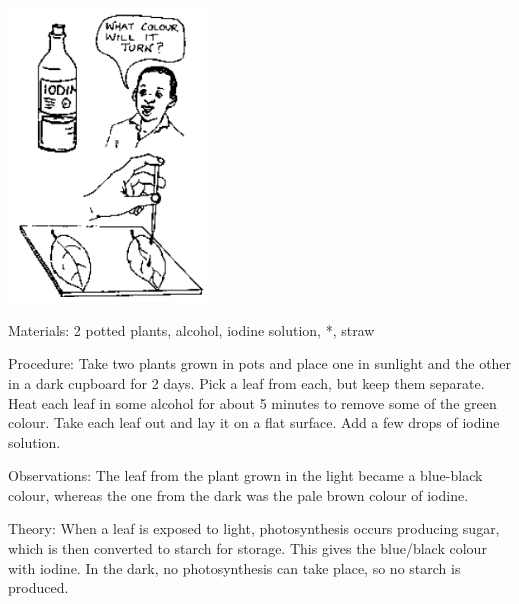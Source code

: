 \begin{multicols}{2}
\begin{center}
\includegraphics[width=0.4\textwidth]{./img/source/photo-starch.png}
\end{center}

\begin{description*}
\item[Materials:]{2 potted plants, alcohol, iodine solution, *, straw}
\item[Procedure:]{Take two plants grown in pots and place one in sunlight and the other in a dark cupboard
for 2 days. Pick a leaf from each, but keep them separate. Heat each leaf in some alcohol for about 5 minutes to remove some of the green colour. Take each leaf out and lay it on
a flat surface. Add a few drops of iodine solution.}
\item[Observations:]{The leaf from the plant grown in the light became a blue-black colour, whereas the one
from the dark was the pale brown colour of iodine.}
\item[Theory:]{When a leaf is exposed to light, photosynthesis occurs producing sugar, which is then
converted to starch for storage. This gives the blue/black colour with iodine. In the dark, no
photosynthesis can take place, so no starch is produced.}
\end{description*}


\end{multicols}
